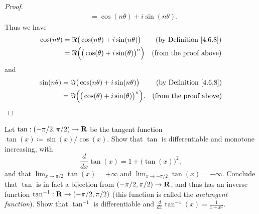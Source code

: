 \begin{proof}
\begin{align*}
         & = \cos(n \theta) + i \sin(n \theta).
    \end{align*}
    Thus we have
    \begin{align*}
        \cos(n \theta) & = \Re\big(\cos(n \theta) + i \sin(n \theta)\big)         & \text{(by Definition \ref{4.6.8})} \\
                       & = \Re\Big(\big(\cos(\theta) + i \sin(\theta)\big)^n\Big) & \text{(from the proof above)}
    \end{align*}
    and
    \begin{align*}
        \sin(n \theta) & = \Im\big(\cos(n \theta) + i \sin(n \theta)\big)          & \text{(by Definition \ref{4.6.8})} \\
                       & = \Im\Big(\big(\cos(\theta) + i \sin(\theta)\big)^n\Big). & \text{(from the proof above)}
    \end{align*}
\end{proof}

\begin{exercise}\label{ex 4.7.8}
    Let \(\tan : (- \pi / 2, \pi / 2) \to \mathbf{R}\) be the tangent function \(\tan(x) \coloneqq \sin(x) / \cos(x)\).
    Show that \(\tan\) is differentiable and monotone increasing, with
    \[
        \frac{d}{dx} \tan(x) = 1 + \big(\tan(x)\big)^2,
    \]
    and that \(\lim_{x \to \pi / 2} \tan(x) = +\infty\) and \(\lim_{x \to -\pi / 2} \tan(x) = -\infty\).
    Conclude that \(\tan\) is in fact a bijection from \((- \pi / 2, \pi / 2) \to \mathbf{R}\), and thus has an inverse function \(\tan^{-1} : \mathbf{R} \to (- \pi / 2, \pi / 2)\)
    (this function is called the \emph{arctangent function}).
    Show that \(\tan^{-1}\) is differentiable and \(\frac{d}{dx} \tan^{-1}(x) = \frac{1}{1 + x^2}\).
\end{exercise}

